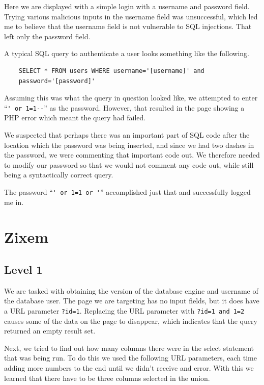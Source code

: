 \documentclass{article}
\begin{document}
Here we are displayed with a simple login with a username and password field. Trying various malicious inputs in the username field was unsuccessful, which led me to believe that the username field is not vulnerable to SQL injections. That left only the password field.

A typical SQL query to authenticate a user looks something like the following.

\begin{verbatim}
	SELECT * FROM users WHERE username='[username]' and
	password='[password]'
\end{verbatim}

Assuming this was what the query in question looked like, we attempted to enter ``\verb`' or 1=1--`'' as the password. However, that resulted in the page showing a PHP error which meant the query had failed.

We suspected that perhaps there was an important part of SQL code after the location which the password was being inserted, and since we had two dashes in the password, we were commenting that important code out. We therefore needed to modify our password so that we would not comment any code out, while still being a syntactically correct query.

The password ``\verb`' or 1=1 or '`'' accomplished just that and successfully logged me in.

\section{Zixem}

\subsection{Level 1}

We are tasked with obtaining the version of the database engine and username of the database user. The page we are targeting has no input fields, but it does have a URL parameter \verb`?id=1`. Replacing the URL parameter with \verb`?id=1 and 1=2` causes some of the data on the page to disappear, which indicates that the query returned an empty result set.

Next, we tried to find out how many columns there were in the select statement that was being run. To do this we used the following URL parameters, each time adding more numbers to the end until we didn't receive and error. With this we learned that there have to be three columns selected in the union.
\end{document}
